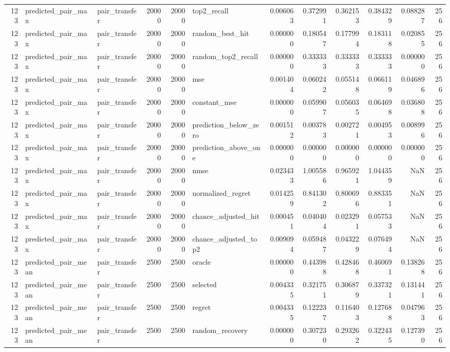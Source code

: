 \begin{tabular}{rllrrlrrrrrr}
123 & predicted_pair_max & pair_transfer & 20000 & 20000 & top2_recall & 0.006063 & 0.372991 & 0.362153 & 0.384329 & 0.088287 & 256 \\
123 & predicted_pair_max & pair_transfer & 20000 & 20000 & random_best_hit & 0.000000 & 0.180547 & 0.177994 & 0.183118 & 0.020855 & 256 \\
123 & predicted_pair_max & pair_transfer & 20000 & 20000 & random_top2_recall & 0.000000 & 0.333333 & 0.333333 & 0.333333 & 0.000000 & 256 \\
123 & predicted_pair_max & pair_transfer & 20000 & 20000 & mse & 0.001404 & 0.060242 & 0.055148 & 0.066119 & 0.046896 & 256 \\
123 & predicted_pair_max & pair_transfer & 20000 & 20000 & constant_mse & 0.000000 & 0.059907 & 0.056035 & 0.064698 & 0.036808 & 256 \\
123 & predicted_pair_max & pair_transfer & 20000 & 20000 & prediction_below_zero & 0.001512 & 0.003783 & 0.002721 & 0.004953 & 0.008996 & 256 \\
123 & predicted_pair_max & pair_transfer & 20000 & 20000 & prediction_above_one & 0.000000 & 0.000000 & 0.000000 & 0.000000 & 0.000000 & 256 \\
123 & predicted_pair_max & pair_transfer & 20000 & 20000 & nmse & 0.023433 & 1.005586 & 0.965921 & 1.044359 & NaN & 256 \\
123 & predicted_pair_max & pair_transfer & 20000 & 20000 & normalized_regret & 0.014259 & 0.841302 & 0.800696 & 0.883351 & NaN & 256 \\
123 & predicted_pair_max & pair_transfer & 20000 & 20000 & chance_adjusted_hit & 0.000451 & 0.040404 & 0.023291 & 0.057533 & NaN & 256 \\
123 & predicted_pair_max & pair_transfer & 20000 & 20000 & chance_adjusted_top2 & 0.009094 & 0.059487 & 0.043229 & 0.076494 & NaN & 256 \\
123 & predicted_pair_mean & pair_transfer & 2500 & 2500 & oracle & 0.000000 & 0.443988 & 0.428468 & 0.460691 & 0.138268 & 256 \\
123 & predicted_pair_mean & pair_transfer & 2500 & 2500 & selected & 0.004335 & 0.321751 & 0.306879 & 0.337321 & 0.131441 & 256 \\
123 & predicted_pair_mean & pair_transfer & 2500 & 2500 & regret & 0.004335 & 0.122237 & 0.116403 & 0.127688 & 0.047963 & 256 \\
123 & predicted_pair_mean & pair_transfer & 2500 & 2500 & random_recovery & 0.000000 & 0.307230 & 0.293262 & 0.322435 & 0.127390 & 256 \\

\end{tabular}
